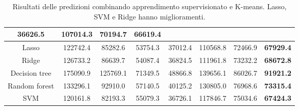 \documentclass{beamer}
\begin{document}
\begin{frame}
\begin{table}[ht]
\begin{tabular}{c|c|c|c|c|c|c|r|}
			36626.5 & 107014.3 & 70194.7 & \textbf{66619.4}\\
			\hline
			\multicolumn{1}{|c|}{Lasso}	& 122742.4 & 85282.6 & 53754.3 &
			37012.4 & 110568.8 & 72466.9 & \textbf{67929.4}\\
			\hline
			\multicolumn{1}{|c|}{Ridge} & 126733.2 & 86639.7 & 54087.4 &
			36824.5 & 111961.8 & 73232.2 & \textbf{68672.8}\\
			\hline
			\multicolumn{1}{|c|}{Decision tree} & 175090.9 & 125769.1 & 71349.5 &
			48866.8 & 139656.1 & 86026.7 & \textbf{91921.2}\\
			\hline
			\multicolumn{1}{|c|}{Random forest} & 133296.1 & 92910.0 & 57140.5 &
			40125.2 & 130805.0 & 76968.6 & \textbf{73315.4}\\
			\hline
			\multicolumn{1}{|c|}{SVM} & 120161.8 & 82193.3 & 55079.3 &
			36726.1 & 117846.7 & 75034.6 & \textbf{67424.3}\\
			\hline
		\end{tabular}
		\caption{Risultati delle predizioni combinando apprendimento supervisionato
		e K-means. \alert{Lasso}, \alert{SVM} e \alert{Ridge} hanno miglioramenti.}
	\end{table}
\end{frame}
\end{document}
